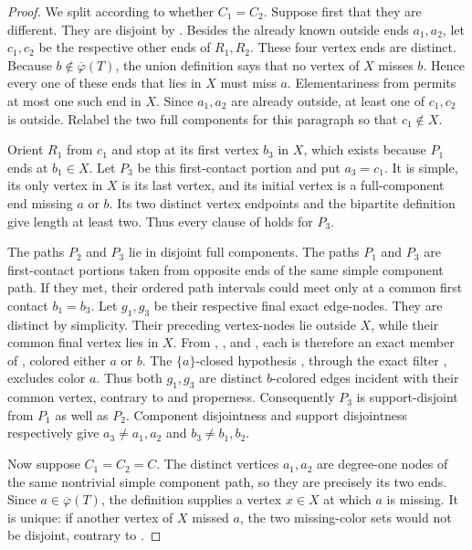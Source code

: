 \begin{proof}
We split according to whether $C_1=C_2$.  Suppose first that they are
different.  They are disjoint by
.  Besides the already known outside
ends $a_1,a_2$, let $c_1,c_2$ be the respective other ends of $R_1,R_2$.
These four vertex ends are distinct.  Because
$b\notin\overline\varphi(T)$, the union definition
 says that no vertex of $X$ misses $b$.  Hence
every one of these ends that lies in $X$ must miss $a$.  Elementariness
from  permits at most one such end in
$X$.  Since $a_1,a_2$ are already outside, at least one of $c_1,c_2$ is
outside.  Relabel the two full components for this paragraph so that
$c_1\notin X$.

Orient $R_1$ from $c_1$ and stop at its first vertex $b_3$ in $X$, which
exists because $P_1$ ends at $b_1\in X$.  Let $P_3$ be this first-contact
portion and put $a_3=c_1$.  It is simple, its only vertex in $X$ is its
last vertex, and its initial vertex is a full-component end missing $a$ or
$b$.  Its two distinct vertex endpoints and the bipartite definition
 give length at least two.  Thus every
clause of  holds for $P_3$.

The paths $P_2$ and $P_3$ lie in disjoint full components.  The paths
$P_1$ and $P_3$ are first-contact portions taken from opposite ends of the
same simple component path.  If they met, their ordered path intervals
could meet only at a common first contact $b_1=b_3$.  Let $g_1,g_3$ be
their respective final exact edge-nodes.  They are distinct by simplicity.
Their preceding vertex-nodes lie outside $X$, while their common final
vertex lies in $X$.  From ,
, and , each
is therefore an exact member of , colored either
$a$ or $b$.  The $\{a\}$-closed hypothesis
, through the exact filter
, excludes color $a$.  Thus both $g_1,g_3$
are distinct $b$-colored edges incident with their common vertex, contrary
to  and properness.  Consequently $P_3$ is
support-disjoint from $P_1$ as well as $P_2$.  Component disjointness and
support disjointness respectively give
$a_3\ne a_1,a_2$ and $b_3\ne b_1,b_2$.

Now suppose $C_1=C_2=C$.  The distinct vertices $a_1,a_2$ are degree-one
nodes of the same nontrivial simple component path, so they are precisely
its two ends.  Since $a\in\overline\varphi(T)$, the definition
 supplies a vertex $x\in X$ at which $a$ is
missing.  It is unique: if another vertex of $X$ missed $a$, the two
missing-color sets would not be disjoint, contrary to
.


\end{proof}
